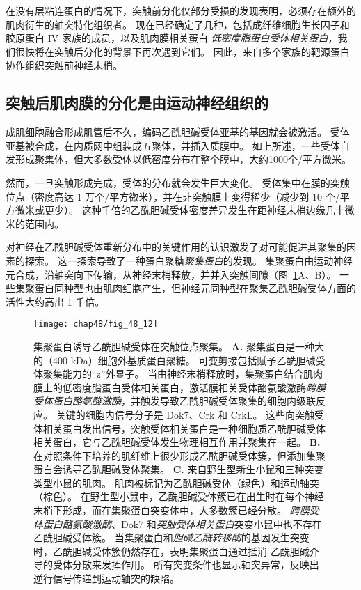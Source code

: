 在没有层粘连蛋白的情况下，突触前分化仅部分受损的发现表明，必须存在额外的肌肉衍生的轴突特化组织者。
现在已经确定了几种，包括成纤维细胞生长因子和胶原蛋白 IV 家族的成员，以及肌肉膜相关蛋白 \textit{低密度脂蛋白受体相关蛋白}，我们很快将在突触后分化的背景下再次遇到它们。
因此，来自多个家族的靶源蛋白协作组织突触前神经末梢。



\subsection{突触后肌肉膜的分化是由运动神经组织的}

成肌细胞融合形成肌管后不久，编码乙酰胆碱受体亚基的基因就会被激活。
受体亚基被合成，在内质网中组装成五聚体，并插入质膜中。
如上所述，一些受体自发形成聚集体，但大多数受体以低密度分布在整个膜中，大约1000个/平方微米。


然而，一旦突触形成完成，受体的分布就会发生巨大变化。
受体集中在膜的突触位点（密度高达 1 万个/平方微米），并在非突触膜上变得稀少（减少到 10 个/平方微米或更少）。
这种千倍的乙酰胆碱受体密度差异发生在距神经末梢边缘几十微米的范围内。


对神经在乙酰胆碱受体重新分布中的关键作用的认识激发了对可能促进其聚集的因素的探索。
这一探索导致了一种蛋白聚糖\textit{聚集蛋白}的发现。
集聚蛋白由运动神经元合成，沿轴突向下传输，从神经末梢释放，并并入突触间隙（图~\ref{fig:48_12}A、B）。
一些集聚蛋白同种型也由肌肉细胞产生，但神经元同种型在聚集乙酰胆碱受体方面的活性大约高出 1 千倍。


\begin{figure}[htbp]
	\centering
	\texttt{[image: chap48/fig\_48\_12]}
	\caption{集聚蛋白诱导乙酰胆碱受体在突触位点聚集。
		\textbf{A.} 聚集蛋白是一种大的（400 kDa）细胞外基质蛋白聚糖。
		可变剪接包括赋予乙酰胆碱受体聚集能力的“z”外显子。
		当由神经末梢释放时，集聚蛋白结合肌肉膜上的低密度脂蛋白受体相关蛋白，激活膜相关受体酪氨酸激酶\textit{跨膜受体蛋白酪氨酸激酶}，并触发导致乙酰胆碱受体聚集的细胞内级联反应。
		关键的细胞内信号分子是 Dok7、Crk 和 CrkL。
		这些向突触受体相关蛋白发出信号，突触受体相关蛋白是一种细胞质乙酰胆碱受体相关蛋白，它与乙酰胆碱受体发生物理相互作用并聚集在一起\cite{dechiara1996receptor}。
		\textbf{B.} 在对照条件下培养的肌纤维上很少形成乙酰胆碱受体簇，但添加集聚蛋白会诱导乙酰胆碱受体聚集\cite{misgeld2005agrin}。
		\textbf{C.} 来自野生型新生小鼠和三种突变类型小鼠的肌肉。
		肌肉被标记为乙酰胆碱受体（绿色）和运动轴突（棕色）。
		在野生型小鼠中，乙酰胆碱受体簇已在出生时在每个神经末梢下形成，而在集聚蛋白突变体中，大多数簇已经分散。
		\textit{跨膜受体蛋白酪氨酸激酶}、Dok7 和\textit{突触受体相关蛋白}突变小鼠中也不存在乙酰胆碱受体簇。
		当集聚蛋白和\textit{胆碱乙酰转移酶}的基因发生突变时，乙酰胆碱受体簇仍然存在，表明集聚蛋白通过抵消 乙酰胆碱介导的受体分散来发挥作用。
		所有突变条件也显示轴突异常，反映出逆行信号传递到运动轴突的缺陷\cite{gautam1996defective}。}
	\label{fig:48_12}
\end{figure}


